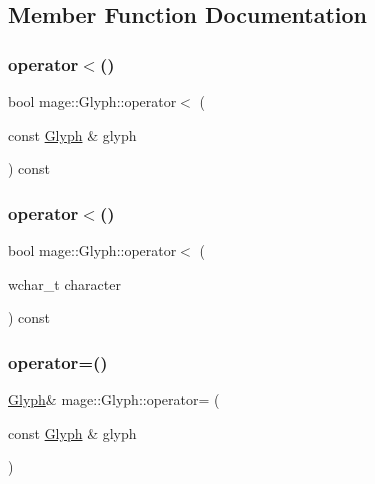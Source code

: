 \subsection{Member Function Documentation}
\hypertarget{structmage_1_1_glyph_a27bcc5e1d96f6891a026e9e7a76251bb}{}\label{structmage_1_1_glyph_a27bcc5e1d96f6891a026e9e7a76251bb} 
\subsubsection{\texorpdfstring{operator$<$()}{operator<()}\hspace{0.1cm}{\footnotesize\ttfamily [1/2]}}
{\footnotesize\ttfamily bool mage\+::\+Glyph\+::operator$<$ (\begin{DoxyParamCaption}\item[{const \hyperlink{structmage_1_1_glyph}{Glyph} \&}]{glyph }\end{DoxyParamCaption}) const}

\hypertarget{structmage_1_1_glyph_a28173087e7daf0b7710cf27f36f7e7e0}{}\label{structmage_1_1_glyph_a28173087e7daf0b7710cf27f36f7e7e0} 
\subsubsection{\texorpdfstring{operator$<$()}{operator<()}\hspace{0.1cm}{\footnotesize\ttfamily [2/2]}}
{\footnotesize\ttfamily bool mage\+::\+Glyph\+::operator$<$ (\begin{DoxyParamCaption}\item[{wchar\+\_\+t}]{character }\end{DoxyParamCaption}) const}

\hypertarget{structmage_1_1_glyph_ae9ea2dff58ce0765d7746af93d97c338}{}\label{structmage_1_1_glyph_ae9ea2dff58ce0765d7746af93d97c338} 
\subsubsection{\texorpdfstring{operator=()}{operator=()}\hspace{0.1cm}{\footnotesize\ttfamily [1/2]}}
{\footnotesize\ttfamily \hyperlink{structmage_1_1_glyph}{Glyph}\& mage\+::\+Glyph\+::operator= (\begin{DoxyParamCaption}\item[{const \hyperlink{structmage_1_1_glyph}{Glyph} \&}]{glyph }\end{DoxyParamCaption})\hspace{0.3cm}{\ttfamily [default]}}

